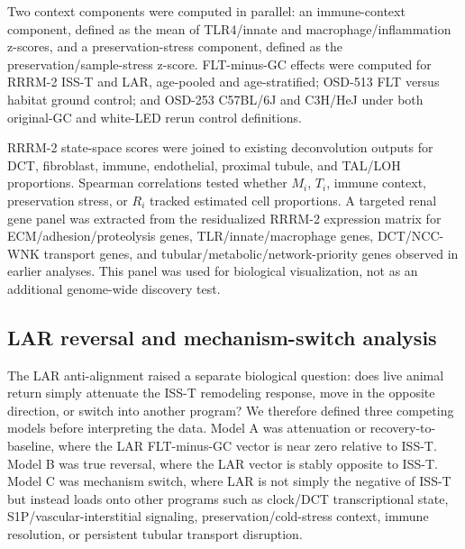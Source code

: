 \documentclass[11pt]{article}
\begin{document}
Two context components were computed in parallel: an immune-context component, defined as the mean of TLR4/innate and macrophage/inflammation z-scores, and a preservation-stress component, defined as the preservation/sample-stress z-score. FLT-minus-GC effects were computed for RRRM-2 ISS-T and LAR, age-pooled and age-stratified; OSD-513 FLT versus habitat ground control; and OSD-253 C57BL/6J and C3H/HeJ under both original-GC and white-LED rerun control definitions.

RRRM-2 state-space scores were joined to existing deconvolution outputs for DCT, fibroblast, immune, endothelial, proximal tubule, and TAL/LOH proportions. Spearman correlations tested whether $M_i$, $T_i$, immune context, preservation stress, or $R_i$ tracked estimated cell proportions. A targeted renal gene panel was extracted from the residualized RRRM-2 expression matrix for ECM/adhesion/proteolysis genes, TLR/innate/macrophage genes, DCT/NCC-WNK transport genes, and tubular/metabolic/network-priority genes observed in earlier analyses. This panel was used for biological visualization, not as an additional genome-wide discovery test.

\subsection{LAR reversal and mechanism-switch analysis}

The LAR anti-alignment raised a separate biological question: does live animal return simply attenuate the ISS-T remodeling response, move in the opposite direction, or switch into another program? We therefore defined three competing models before interpreting the data. Model A was attenuation or recovery-to-baseline, where the LAR FLT-minus-GC vector is near zero relative to ISS-T. Model B was true reversal, where the LAR vector is stably opposite to ISS-T. Model C was mechanism switch, where LAR is not simply the negative of ISS-T but instead loads onto other programs such as clock/DCT transcriptional state, S1P/vascular-interstitial signaling, preservation/cold-stress context, immune resolution, or persistent tubular transport disruption.
\end{document}
